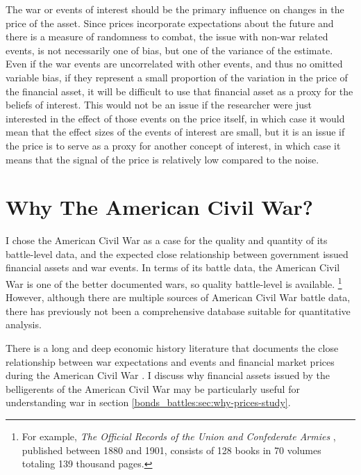 The war or events of interest should be the primary influence on changes in the price of the asset.
Since prices incorporate expectations about the future and there is a measure of randomness to combat, the issue with non-war related events, is not necessarily one of bias, but one of the variance of the estimate.
Even if the war events are uncorrelated with other events, and thus no omitted variable bias, if they represent a small proportion of the variation in the price of the financial asset, it will be difficult to use that financial asset as a proxy for the beliefs of interest.
This would not be an issue if the researcher were just interested in the effect of those events on the price itself, in which case it would mean that the effect sizes of the events of interest are small, but it is an issue if the price is to serve as a proxy for another concept of interest, in which case it means that the signal of the price is relatively low compared to the noise.





\section{Why The American Civil War?}
\label{bonds_battles:sec:why-american-civil}

I chose the American Civil War as a case for the quality and quantity of its battle-level data, and the expected close relationship between government issued financial assets and war events.
In terms of its battle data, the American Civil War is one of the better documented wars, so quality battle-level is available.%
\footnote{%
  For example, \textit{The Official Records of the Union and  Confederate Armies} \parencites{US1901}, published between 1880 and 1901, consists of 128 books in 70 volumes totaling 139 thousand pages. %
} %
However, although there are multiple sources of American Civil War battle data, there has previously not been a comprehensive database suitable for quantitative analysis.

There is a long and deep economic history literature that documents the close relationship between war expectations and events and financial market prices during the American Civil War \parencites{Mitchell1903}{Mitchell1908}{Calomiris1988}{WillardGuinnaneEtAl1996}{McCandless1996}{SmithSmith1997}{Schwab1901}{Weidenmier2002}{BurdekinLangdana1993}{DavisPecquet1990}{BrownBurdekin2000}{OosterlinckWeidenmier2007}{Roll1972}.
I discuss why financial assets issued by the belligerents of the American Civil War may be particularly useful for understanding war in section \ref{bonds_battles:sec:why-prices-study}.

